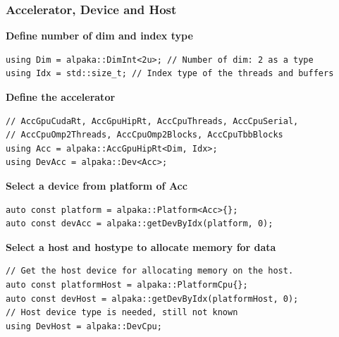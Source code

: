 \documentclass[9pt]{beamer}
\begin{document}
\begin{frame}[fragile]
\frametitle{Accelerator, Device and Host}
\textbf{Define number of dim and index type}
\begin{lstlisting}
using Dim = alpaka::DimInt<2u>; // Number of dim: 2 as a type
using Idx = std::size_t; // Index type of the threads and buffers
\end{lstlisting}

\textbf{Define the accelerator}
\begin{lstlisting}
// AccGpuCudaRt, AccGpuHipRt, AccCpuThreads, AccCpuSerial,
// AccCpuOmp2Threads, AccCpuOmp2Blocks, AccCpuTbbBlocks
using Acc = alpaka::AccGpuHipRt<Dim, Idx>;
using DevAcc = alpaka::Dev<Acc>;
\end{lstlisting}
\textbf{Select a device from platform of Acc}
\begin{lstlisting}
auto const platform = alpaka::Platform<Acc>{};
auto const devAcc = alpaka::getDevByIdx(platform, 0);
\end{lstlisting}
\textbf{Select a host and hostype to allocate memory for data}
\begin{lstlisting}
// Get the host device for allocating memory on the host.
auto const platformHost = alpaka::PlatformCpu{};
auto const devHost = alpaka::getDevByIdx(platformHost, 0);
// Host device type is needed, still not known
using DevHost = alpaka::DevCpu;
\end{lstlisting}
\end{frame}
\end{document}
